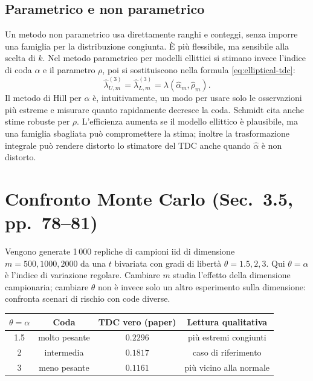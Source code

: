\documentclass[11pt,a4paper]{article}
\begin{document}
\subsection{Parametrico e non parametrico}
Un metodo non parametrico usa direttamente ranghi e conteggi, senza imporre una
famiglia per la distribuzione congiunta. È più flessibile, ma sensibile alla
scelta di $k$. Nel metodo parametrico per modelli ellittici si stimano invece
l'indice di coda $\alpha$ e il parametro $\rho$, poi si sostituiscono nella
formula \eqref{eq:elliptical-tdc}:
\begin{equation}
 \widehat\lambda_{U,m}^{(3)}
 =\widehat\lambda_{L,m}^{(3)}
 =\lambda\!\left(\widehat\alpha_m,\widehat\rho_m\right).
 \label{eq:param}
\end{equation}
Il metodo di Hill per $\alpha$ è, intuitivamente, un modo per usare solo le
osservazioni più estreme e misurare quanto rapidamente decresce la coda.
Schmidt cita anche stime robuste per $\rho$. L'efficienza aumenta se il
modello ellittico è plausibile, ma una famiglia sbagliata può compromettere la
stima; inoltre la trasformazione integrale può rendere distorto lo stimatore
del TDC anche quando $\widehat\alpha$ è non distorto.

\section{Confronto Monte Carlo (Sec.~3.5, pp.~78--81)}

Vengono generate 1\,000 repliche di campioni iid di dimensione
$m=500,1000,2000$ da una $t$ bivariata con gradi di libertà
$\theta=1.5,2,3$. Qui $\theta=\alpha$ è l'indice di variazione regolare.
Cambiare $m$ studia l'effetto della dimensione campionaria; cambiare $\theta$
non è invece solo un altro esperimento sulla dimensione: confronta scenari di
rischio con code diverse.

\begin{center}
\small
\begin{tabular}{c|c|c|c}
\toprule
$\theta=\alpha$ & Coda & TDC vero (paper) & Lettura qualitativa\\
\midrule
1.5 & molto pesante & $0.2296$ & più estremi congiunti\\
2 & intermedia & $0.1817$ & caso di riferimento\\
3 & meno pesante & $0.1161$ & più vicino alla normale\\
\bottomrule
\end{tabular}
\end{center}
\end{document}
